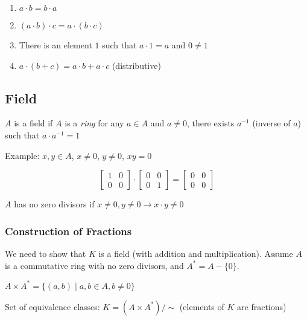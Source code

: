\documentclass{article}
\begin{document}
    \begin{enumerate}
        \item $a \cdot b = b \cdot a$
        \item $(a \cdot b) \cdot c = a \cdot (b \cdot c)$
        \item There is an element $1$ such that $a \cdot 1 = a$ and $0 \neq 1$
        \item $a \cdot (b + c) = a \cdot b + a \cdot c$ (distributive)
    \end{enumerate}

    \subsection{Field}
    
    $A$ is a field if $A$ is a \textit{ring} for any $a \in A$ and $a \neq 0$, there exists $a^{-1}$ (inverse of $a$) such that $a \cdot a^{-1} = 1$
    
    Example: $x, y \in A$, $x \neq 0$, $y \neq 0$, $xy = 0$
    
    \begin{displaymath}
    \begin{bmatrix}
        1 & 0 \\
        0 & 0
    \end{bmatrix}
    \cdot
    \begin{bmatrix}
        0 & 0 \\
        0 & 1
    \end{bmatrix}
    =
    \begin{bmatrix}
        0 & 0 \\
        0 & 0
    \end{bmatrix}
    \end{displaymath}
    
    $A$ has no zero divisors if $x \neq 0, y \neq 0 \rightarrow x \cdot y \neq 0$ 
    
    \subsubsection{Construction of Fractions}
    
    We need to show that $K$ is a field (with addition and multiplication). Assume $A$ is a commutative ring with no zero divisors, and $A^{\ast} = A - \{ 0 \}$.
    
    $A \times A^{\ast} = \{ (a, b) \mid a, b \in A, b \neq 0 \}$
    
    Set of equivalence classes: $K = (A \times A^{\ast}) / \sim$ (elements of $K$ are fractions)
    
\end{document}
